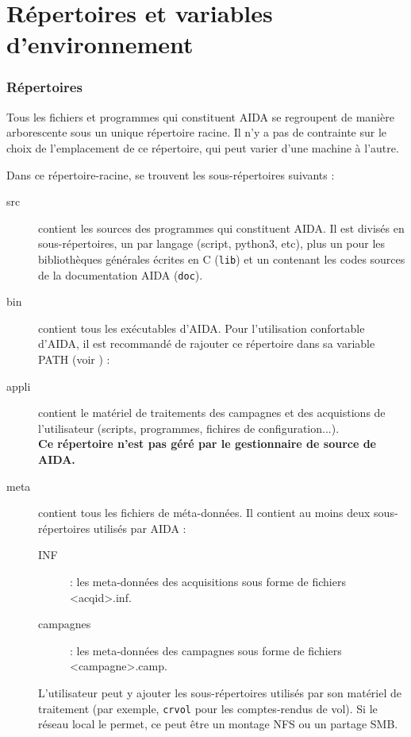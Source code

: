 \part{Répertoires et variables d'environnement}
\label{part:arbo}
\section{Répertoires}
\label{sec:repert}
   Tous les fichiers et programmes qui constituent AIDA se regroupent de
manière arborescente sous un unique répertoire racine. Il n'y a pas 
de contrainte sur le choix de l'emplacement de ce répertoire, qui peut 
varier d'une machine à l'autre.

 Dans ce répertoire-racine, se trouvent les sous-répertoires suivants :
\begin{description}
  \item[src] contient les sources des programmes qui constituent AIDA. Il 
   est divisés en sous-répertoires, un par langage (script, 
   python3, etc), plus un pour les bibliothèques générales écrites en C
   (\texttt{lib}) et un contenant les codes sources de la documentation
   AIDA (\texttt{doc}).

  \item[bin] contient tous les exécutables d'AIDA. Pour l'utilisation
   confortable d'AIDA, il est recommandé de rajouter ce répertoire
   dans sa variable PATH (voir ) :

  \item[appli] contient le matériel de traitements des campagnes et des
    acquistions de l'utilisateur (scripts, programmes, fichires de
    configuration...). \\
    \textbf{Ce répertoire n'est pas géré par le gestionnaire de source de AIDA.}

  \item[meta] contient tous les fichiers de méta-données. Il contient au moins
   deux sous-répertoires utilisés par AIDA :
      \begin{description}
       \item[INF] : les meta-données des acquisitions sous forme de fichiers
                    <acqid>.inf.
       \item[campagnes] : les meta-données des campagnes sous forme de fichiers
		                <campagne>.camp.
      \end{description}
   L'utilisateur peut y ajouter les sous-répertoires utilisés par son matériel
   de traitement (par exemple, \texttt{crvol} pour les comptes-rendus de vol).
   Si le réseau local le permet, ce peut être un montage NFS ou un
   partage SMB.


\end{description}
